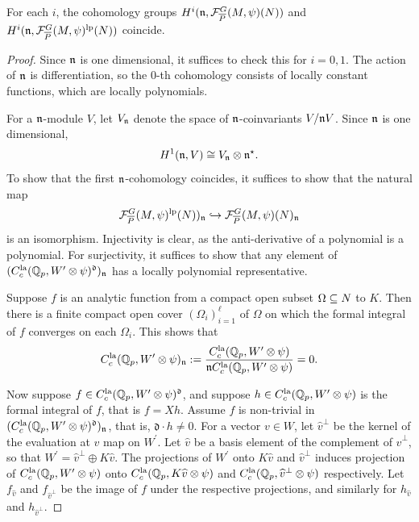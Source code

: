 \documentclass[10pt]{amsart}
\begin{document}
\begin{lemma}\label{lem:n_cohom_N_section}
For each $i$, the cohomology groups $H^{i}(\mathfrak{n},\mathcal{F}_{\overline{P}}^{G}(M,\psi)(N))$ and $H^{i}(\mathfrak{n},\mathcal{F}_{\overline{P}}^{G}(M,\psi)^{\textnormal{lp}}(N))$ coincide.
\end{lemma}
\begin{proof}
Since $\mathfrak{n}$ is one dimensional, it suffices to check this for $i=0,1$. The action of $\mathfrak{n}$ is differentiation, so the $0$-th cohomology consists of locally constant functions, which are locally polynomials. 

For a $\mathfrak{n}$-module $V$, let $V_{\mathfrak{n}}$ denote the space of $\mathfrak{n}$-coinvariants $V/\mathfrak{n} V$. Since $\mathfrak{n}$ is one dimensional, \begin{equation}\label{eq:n_cohom_formula}
    H^{1}(\mathfrak{n},V)\cong V_{\mathfrak{n}}\otimes \mathfrak{n}^{\star}.
\end{equation} To show that the first $\mathfrak{n}$-cohomology coincides, it suffices to show that the natural map \begin{equation*}
    \mathcal{F}_{\overline{P}}^{G}(M,\psi)^{\textnormal{lp}}(N))_{\mathfrak{n}} \hookrightarrow \mathcal{F}_{\overline{P}}^{G}(M,\psi)(N)_{\mathfrak{n}}
\end{equation*} is an isomorphism. Injectivity is clear, as the anti-derivative of a polynomial is a polynomial. For surjectivity, it suffices to show that any element of $(C^{\textnormal{la}}_{c}(\mathbb{Q}_{p},W^{\prime}\otimes\psi)^{\mathfrak{d}})_{\mathfrak{n}}$ has a locally polynomial representative.

Suppose $f$ is an analytic function from a compact open subset $\Omega\subseteq N$ to $K$. Then there is a finite compact open cover $(\Omega_{i})_{i=1}^{\ell}$ of $\Omega$ on which the formal integral of $f$ converges on each $\Omega_{i}$. This shows that \[
    C^{\textnormal{la}}_{c}(\mathbb{Q}_{p},W^{\prime}\otimes\psi)_{\mathfrak{n}} := \frac{C^{\textnormal{la}}_{c}(\mathbb{Q}_{p},W^{\prime}\otimes\psi)}{\mathfrak{n} C^{\textnormal{la}}_{c}(\mathbb{Q}_{p},W^{\prime}\otimes\psi)} = 0.
\] 

Now suppose $f\in C^{\textnormal{la}}_{c}(\mathbb{Q}_{p},W^{\prime}\otimes\psi)^{\mathfrak{d}}$, and suppose $h\in C^{\textnormal{la}}_{c}(\mathbb{Q}_{p},W^{\prime}\otimes\psi)$ is the formal integral of $f$, that is $f=Xh$. Assume $f$ is non-trivial in $(C^{\textnormal{la}}_{c}(\mathbb{Q}_{p},W^{\prime}\otimes\psi)^{\mathfrak{d}})_{\mathfrak{n}}$, that is, $\mathfrak{d}\cdot h\neq 0$. For a vector $v\in W$, let $\widehat{v}^{\perp}$ be the kernel of the evaluation at $v$ map on $W^{\prime}$. Let $\widehat{v}$ be a basis element of the complement of $\widehat{v}^{\perp}$, so that $W^{\prime}=\widehat{v}^{\perp}\oplus K\widehat{v}$. The projections of $W^{\prime}$ onto $K\widehat{v}$ and $\widehat{v}^{\perp}$ induces projection of $C^{\textnormal{la}}_{c}(\mathbb{Q}_{p},W^{\prime}\otimes\psi)$ onto $C^{\textnormal{la}}_{c}(\mathbb{Q}_{p},K\widehat{v}\otimes \psi)$ and $C^{\textnormal{la}}_{c}(\mathbb{Q}_{p},\widehat{v}^\perp\otimes\psi)$ respectively. Let $f_{\widehat{v}}$ and $f_{\widehat{v}^{\perp}}$ be the image of $f$ under the respective projections, and similarly for $h_{\widehat{v}}$ and $h_{\widehat{v}^{\perp}}$. 


\end{proof}
\end{document}
